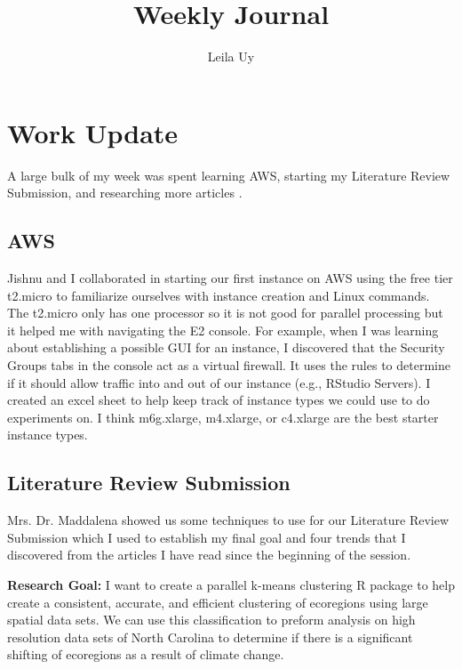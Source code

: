 \documentclass[a4paper,10pt]{article}
\title{Weekly Journal}
\author{Leila Uy}
\begin{document}
\maketitle

\section{Work Update}
A large bulk of my week was spent learning AWS, starting my Literature Review Submission, and researching more articles 
\cite{babatunde2019impact, jain2010data, tang2017parallel, tierney2008snow}. 

\subsection{AWS}
Jishnu and I collaborated in starting our first instance on AWS using the free tier t2.micro to familiarize ourselves with 
instance creation and Linux commands. The t2.micro only has one processor so it is not good for parallel processing but 
it helped me with navigating the E2 console. For example, when I was learning about establishing a possible GUI for an 
instance, I discovered that the Security Groups tabs in the console act as a virtual firewall. It uses the rules to 
determine if it should allow traffic into and out of our instance (e.g., RStudio Servers). I created an excel sheet to help 
keep track of instance types we could use to do experiments on. I think m6g.xlarge, m4.xlarge, or c4.xlarge are the best 
starter instance types.

\subsection{Literature Review Submission}
Mrs. Dr. Maddalena showed us some techniques to use for our Literature Review Submission which I used to establish my 
final goal and four trends that I discovered from the articles I have read since the beginning of the session.

\textbf{Research Goal:} I want to create a parallel k-means clustering R package to help create a consistent, accurate, 
and efficient clustering of ecoregions using large spatial data sets. We can use this classification to preform analysis 
on high resolution data sets of North Carolina to determine if there is a significant shifting of ecoregions as a result 
of climate change.
\end{document}
